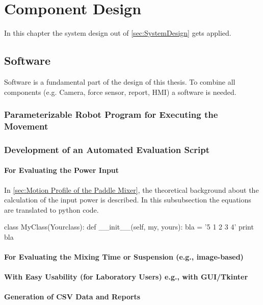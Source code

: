 \chapter{Component Design}

In this chapter the system design out of \autoref{sec:SystemDesign} gets applied. 

\section{Software}

Software is a fundamental part of the design of this thesis. To combine all components (e.g. Camera, force sensor, report, HMI) a software is needed. 

\subsection{Parameterizable Robot Program for Executing the Movement}



\subsection{Development of an Automated Evaluation Script}
\subsubsection{For Evaluating the Power Input}

In \autoref{sec:Motion Profile of the Paddle Mixer}, the theoretical background about the calculation of the input power is described. In this subsubsection the equations are translated to python code.

\begin{python}
    class MyClass(Yourclass):
        def __init__(self, my, yours):
            bla = '5 1 2 3 4'
            print bla
\end{python}
\subsubsection{For Evaluating the Mixing Time or Suspension (e.g., image-based)}
\subsubsection{With Easy Usability (for Laboratory Users) e.g., with GUI/Tkinter}
\subsubsection{Generation of CSV Data and Reports}
